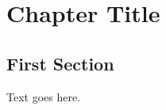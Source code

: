 \documentclass[../main]{subfiles}
\begin{document}

\chapter{Chapter Title}

\section{First Section}
Text goes here.

\end{document}
